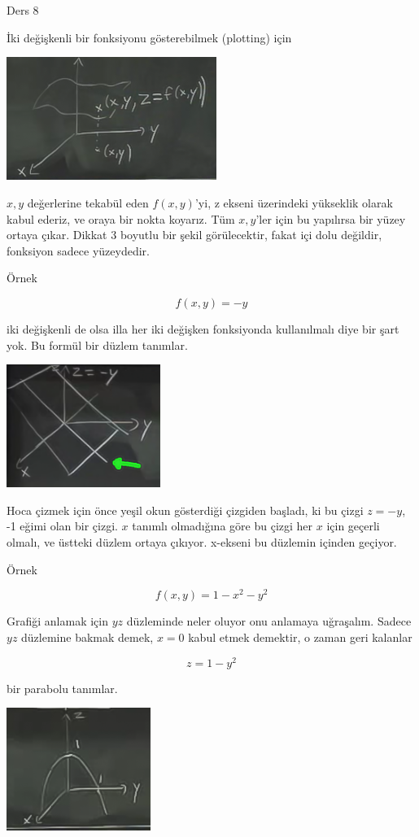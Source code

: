 \documentclass[12pt,fleqn]{article}\usepackage{../../common}
\begin{document}
Ders 8

İki değişkenli bir fonksiyonu gösterebilmek (plotting) için 

\includegraphics[height=4cm]{8_1.png}

$x,y$ değerlerine tekabül eden $f(x,y)$'yi, z ekseni üzerindeki yükseklik olarak
kabul ederiz, ve oraya bir nokta koyarız. Tüm $x,y$'ler için bu yapılırsa bir
yüzey ortaya çıkar. Dikkat 3 boyutlu bir şekil görülecektir, fakat içi dolu
değildir, fonksiyon sadece yüzeydedir.

Örnek

$$ f(x,y) = -y $$

iki değişkenli de olsa illa her iki değişken fonksiyonda kullanılmalı diye
bir şart yok. Bu formül bir düzlem tanımlar. 

\includegraphics[height=4cm]{8_2.png}

Hoca çizmek için önce yeşil okun gösterdiği çizgiden başladı, ki bu çizgi
$z=-y$, -1 eğimi olan bir çizgi. $x$ tanımlı olmadığına göre bu çizgi her $x$
için geçerli olmalı, ve üstteki düzlem ortaya çıkıyor. x-ekseni bu düzlemin
içinden geçiyor.

Örnek 

$$ f(x,y) = 1-x^2-y^2 $$

Grafiği anlamak için $yz$ düzleminde neler oluyor onu anlamaya
uğraşalım. Sadece $yz$ düzlemine bakmak demek, $x=0$ kabul etmek demektir,
o zaman geri kalanlar 

$$ z = 1-y^2 $$

bir parabolu tanımlar. 

\includegraphics[height=4cm]{8_3.png}
\end{document}
